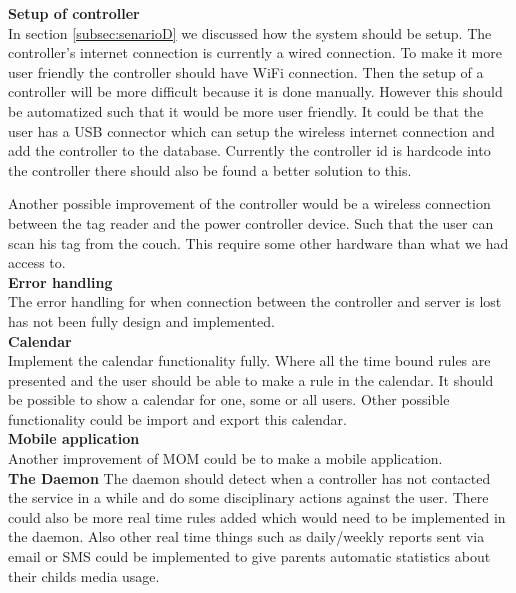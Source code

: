 \textbf{Setup of controller}\\
In section \vref{subsec:senarioD} we discussed how the system should be setup. The controller's internet connection is currently a wired connection. To make it more user friendly the controller should have WiFi connection. Then the setup of a controller will be more difficult because it is done manually. However this should be automatized such that it would be more user friendly. It could be that the user has a USB connector which can setup the wireless internet connection and add the controller to the database. Currently the controller id is hardcode into the controller there should also be found a better solution to this. 

Another possible improvement of the controller would be a wireless connection between the tag reader and the power controller device. Such that the user can scan his tag from the couch. This require some other hardware than what we had access to.\\

\textbf{Error handling}\\
The error handling for when connection between the controller and server is lost has not been fully design and implemented. \\

\textbf{Calendar}\\
Implement the calendar functionality fully. Where all the time bound rules are presented and the user should be able to make a rule in the calendar. It should be possible to show a calendar for one, some or all users. Other possible functionality could be import and export this calendar.\\

\textbf{Mobile application}\\
Another improvement of MOM could be to make a mobile application.\\

\textbf{The Daemon}
The daemon should detect when a controller has not contacted the service in a while and do some disciplinary actions against the user. There could also be more real time rules added which would need to be implemented in the daemon. Also other real time things such as daily/weekly reports sent via email or SMS could be implemented to give parents automatic statistics about their childs media usage. 